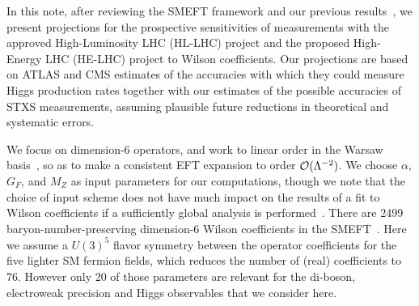 \documentclass[../report.tex]{subfiles}
\begin{document}
\label{sec8:intro}

\label{sec8:smeft}

In this note, after reviewing the SMEFT framework and our previous results~\cite{Ellis:2018gqa,Ellis:2014dva, Ellis:2014jta, Murphy:2017omb}, we present projections for the
prospective sensitivities of measurements with the approved High-Luminosity LHC (HL-LHC) project and the proposed High-Energy LHC (HE-LHC) project
to Wilson coefficients. 
Our projections are based on ATLAS and CMS estimates of the accuracies with which they
could measure Higgs production rates together with our estimates of the possible accuracies of STXS
measurements, assuming plausible future reductions in theoretical and systematic errors.


We focus on dimension-6 operators, and work to linear order in the Warsaw basis~\cite{Grzadkowski:2010es},
so as to make a consistent EFT expansion to order ${\cal O}(\Lambda^{-2})$. 
We choose $\alpha$, $G_F$, and $M_Z$ as input parameters for our computations, though we note that
the choice of input scheme does not have much impact on the results of a fit to Wilson coefficients if a sufficiently global analysis is performed~\cite{Brivio:2017bnu}.
There are 2499 baryon-number-preserving dimension-6 Wilson coefficients in the SMEFT~\cite{Alonso:2013hga}.
Here we assume a $U(3)^5$ flavor symmetry between the operator coefficients for the five lighter SM fermion fields,
which reduces the number of (real) coefficients to 76.
However only 20 of those parameters are relevant for the di-boson, electroweak precision and Higgs observables that we consider here.
\end{document}
